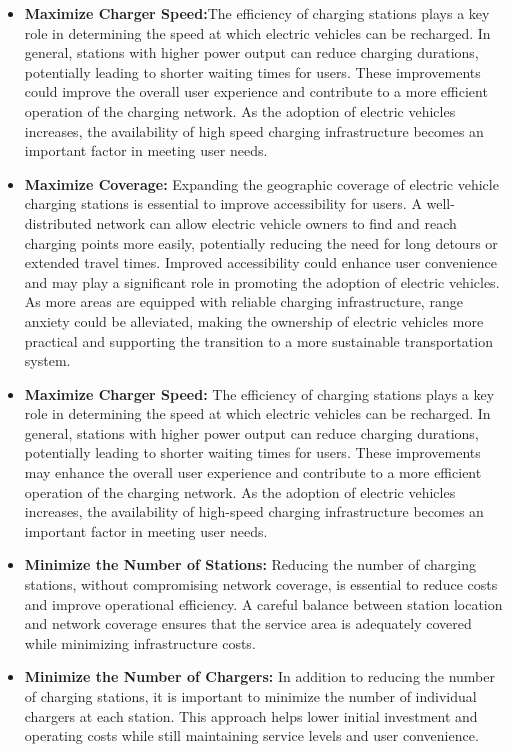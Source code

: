 \begin{itemize}
    \item \textbf{Maximize Charger Speed:}The efficiency of charging stations plays a key role in determining the speed at which electric vehicles can be recharged. In general, stations with higher power output can reduce charging durations, potentially leading to shorter waiting times for users. These improvements could improve the overall user experience and contribute to a more efficient operation of the charging network. As the adoption of electric vehicles increases, the availability of high speed charging infrastructure becomes an important factor in meeting user needs.
    
    \item \textbf{Maximize Coverage:} Expanding the geographic coverage of electric vehicle charging stations is essential to improve accessibility for users. A well-distributed network can allow electric vehicle owners to find and reach charging points more easily, potentially reducing the need for long detours or extended travel times. Improved accessibility could enhance user convenience and may play a significant role in promoting the adoption of electric vehicles. As more areas are equipped with reliable charging infrastructure, range anxiety could be alleviated, making the ownership of electric vehicles more practical and supporting the transition to a more sustainable transportation system.


    
    \item \textbf{Maximize Charger Speed:} The efficiency of charging stations plays a key role in determining the speed at which electric vehicles can be recharged. In general, stations with higher power output can reduce charging durations, potentially leading to shorter waiting times for users. These improvements may enhance the overall user experience and contribute to a more efficient operation of the charging network. As the adoption of electric vehicles increases, the availability of high-speed charging infrastructure becomes an important factor in meeting user needs.
    
    \item \textbf{Minimize the Number of Stations:} Reducing the number of charging stations, without compromising network coverage, is essential to reduce costs and improve operational efficiency. A careful balance between station location and network coverage ensures that the service area is adequately covered while minimizing infrastructure costs.
    
    \item \textbf{Minimize the Number of Chargers:} In addition to reducing the number of charging stations, it is important to minimize the number of individual chargers at each station. This approach helps lower initial investment and operating costs while still maintaining service levels and user convenience.    

\end{itemize}


